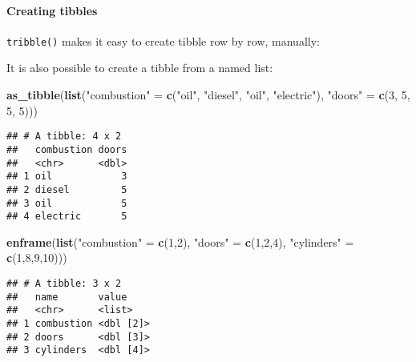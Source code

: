 \documentclass[
]{article}
\newenvironment{Shaded}{\begin{snugshade}}{\end{snugshade}}
\newcommand{\DecValTok}[1]{\textcolor[rgb]{0.00,0.00,0.81}{#1}}
\newcommand{\KeywordTok}[1]{\textcolor[rgb]{0.13,0.29,0.53}{\textbf{#1}}}
\newcommand{\NormalTok}[1]{#1}
\newcommand{\StringTok}[1]{\textcolor[rgb]{0.31,0.60,0.02}{#1}}
\begin{document}
\hypertarget{creating-tibbles}{%
\paragraph{Creating tibbles}\label{creating-tibbles}}

\texttt{tribble()} makes it easy to create tibble row by row, manually:

It is also possible to create a tibble from a named list:

\begin{Shaded}
\begin{Highlighting}[]
\KeywordTok{as\_tibble}\NormalTok{(}\KeywordTok{list}\NormalTok{(}\StringTok{"combustion"}\NormalTok{ =}\StringTok{ }\KeywordTok{c}\NormalTok{(}\StringTok{"oil"}\NormalTok{, }\StringTok{"diesel"}\NormalTok{, }\StringTok{"oil"}\NormalTok{, }\StringTok{"electric"}\NormalTok{),}
               \StringTok{"doors"}\NormalTok{ =}\StringTok{ }\KeywordTok{c}\NormalTok{(}\DecValTok{3}\NormalTok{, }\DecValTok{5}\NormalTok{, }\DecValTok{5}\NormalTok{, }\DecValTok{5}\NormalTok{)))}
\end{Highlighting}
\end{Shaded}

\begin{verbatim}
## # A tibble: 4 x 2
##   combustion doors
##   <chr>      <dbl>
## 1 oil            3
## 2 diesel         5
## 3 oil            5
## 4 electric       5
\end{verbatim}

\begin{Shaded}
\begin{Highlighting}[]
\KeywordTok{enframe}\NormalTok{(}\KeywordTok{list}\NormalTok{(}\StringTok{"combustion"}\NormalTok{ =}\StringTok{ }\KeywordTok{c}\NormalTok{(}\DecValTok{1}\NormalTok{,}\DecValTok{2}\NormalTok{), }\StringTok{"doors"}\NormalTok{ =}\StringTok{ }\KeywordTok{c}\NormalTok{(}\DecValTok{1}\NormalTok{,}\DecValTok{2}\NormalTok{,}\DecValTok{4}\NormalTok{), }\StringTok{"cylinders"}\NormalTok{ =}\StringTok{ }\KeywordTok{c}\NormalTok{(}\DecValTok{1}\NormalTok{,}\DecValTok{8}\NormalTok{,}\DecValTok{9}\NormalTok{,}\DecValTok{10}\NormalTok{)))}
\end{Highlighting}
\end{Shaded}

\begin{verbatim}
## # A tibble: 3 x 2
##   name       value    
##   <chr>      <list>   
## 1 combustion <dbl [2]>
## 2 doors      <dbl [3]>
## 3 cylinders  <dbl [4]>
\end{verbatim}
\end{document}
